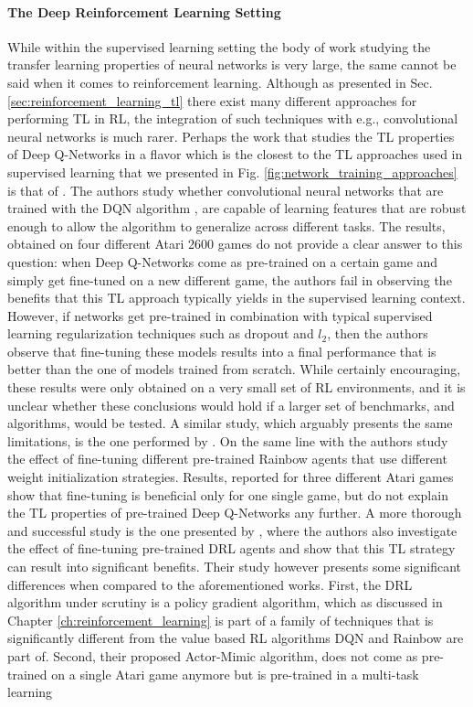 \paragraph{The Deep Reinforcement Learning Setting}
While within the supervised learning setting the body of work studying the transfer learning properties of neural networks is very large, the same cannot be said when it comes to reinforcement learning. Although as presented in Sec. \ref{sec:reinforcement_learning_tl} there exist many different approaches for performing TL in RL, the integration of such techniques with e.g., convolutional neural networks is much rarer. Perhaps the work that studies the TL properties of Deep Q-Networks in a flavor which is the closest to the TL approaches used in supervised learning that we presented in Fig. \ref{fig:network_training_approaches} is that of \citet{farebrother2018generalization}. The authors study whether convolutional neural networks that are trained with the DQN algorithm \cite{mnih2015human}, are capable of learning features that are robust enough to allow the algorithm to generalize across different tasks. The results, obtained on four different Atari 2600 games do not provide a clear answer to this question: when Deep Q-Networks come as pre-trained on a certain game and simply get fine-tuned on a new different game, the authors fail in observing the benefits that this TL approach typically yields in the supervised learning context. However, if networks get pre-trained in combination with typical supervised learning regularization techniques such as dropout \cite{srivastava2014dropout} and $l_2$, then the authors observe that fine-tuning these models results into a final performance that is better than the one of models trained from scratch. While certainly encouraging, these results were only obtained on a very small set of RL environments, and it is unclear whether these conclusions would hold if a larger set of benchmarks, and algorithms, would be tested. A similar study, which arguably presents the same limitations, is the one performed by \citet{tyo2020transferable}. On the same line with \citet{farebrother2018generalization} the authors study the effect of fine-tuning different pre-trained Rainbow agents \cite{hessel2018rainbow} that use different weight initialization strategies. Results, reported for three different Atari games show that fine-tuning is beneficial only for one single game, but do not explain the TL properties of pre-trained Deep Q-Networks any further. A more thorough and successful study is the one presented by \citet{parisotto2015actor}, where the authors also investigate the effect of fine-tuning pre-trained DRL agents and show that this TL strategy can result into significant benefits. Their study however presents some significant differences when compared to the aforementioned works. First, the DRL algorithm under scrutiny is a policy gradient algorithm, which as discussed in Chapter \ref{ch:reinforcement_learning} is part of a family of techniques that is significantly different from the value based RL algorithms DQN and Rainbow are part of. Second, their proposed Actor-Mimic algorithm, does not come as pre-trained on a single Atari game anymore but is pre-trained in a multi-task learning 
